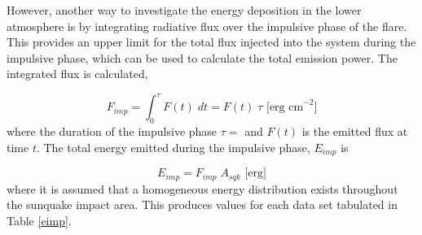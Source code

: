 \noindent
However, another way to investigate the energy deposition in the lower atmosphere is by integrating radiative flux over the impulsive phase of the flare. This provides an upper limit for the total flux injected into the system during the impulsive phase, which can be used to calculate the total emission power. The integrated flux is calculated,

\begin{equation}
F_{imp} = \int_{0}^{\tau} F(t) \; dt = F(t) \; \tau \text{ [erg cm}^{-2}]
\end{equation}\label{f-imp}
\noindent
where the duration of the impulsive phase $\tau = $ and $F(t)$ is the emitted flux at time $t$. The total energy emitted during the impulsive phase, $E_{imp}$ is

\begin{equation}
E_{imp}=F_{imp} \; A_{sqk} \text{ [erg}]
\end{equation}\label{e-imp}
\noindent
where it is assumed that a homogeneous energy distribution exists throughout the sunquake impact area. This produces values for each data set tabulated in Table \ref{eimp}. 


